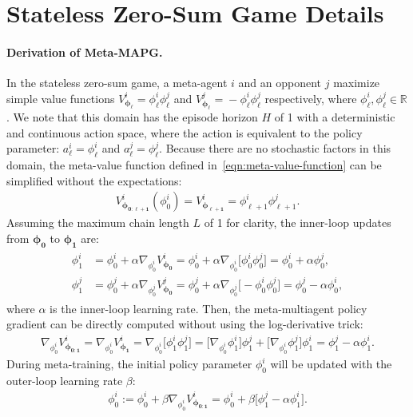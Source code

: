 \section{Stateless Zero-Sum Game Details}\label{sec:details-stateless-zero-sum}
\noindent\paragraph{Derivation of Meta-MAPG.}
In the stateless zero-sum game, a meta-agent $i$ and an opponent $j$ maximize simple value functions $V^{i}_{\bm{\phi}_{\bm{\ell}}}\!=\!\phi^{i}_{\ell}\phi^{j}_{\ell}$ and $V^{j}_{\bm{\phi}_{\bm{\ell}}}\!=\!-\phi^{i}_{\ell}\phi^{j}_{\ell}$ respectively, where $\phi^{i}_{\ell},\phi^{j}_{\ell}\!\in\!\mathbb{R}$. 
We note that this domain has the episode horizon $H$ of 1 with a deterministic and continuous action space, where the action is equivalent to the policy parameter: $a^{i}_{\ell}\!=\!\phi^{i}_{\ell}$ and $a^{j}_{\ell}\!=\!\phi^{j}_{\ell}$. Because there are no stochastic factors in this domain, the meta-value function defined in~\cref{eqn:meta-value-function} can be simplified without the expectations:
\begin{gather}
V^{i}_{\bm{\phi}_{\bm{0:\ell+1}}}(\phi^{i}_{0})=V^{i}_{\bm{\phi}_{\bm{\ell+1}}}=\phi^{i}_{\ell+1}\phi^{j}_{\ell+1}.
\end{gather}
Assuming the maximum chain length $L$ of 1 for clarity, the inner-loop updates from $\bm{\phi}_{\bm{0}}$ to $\bm{\phi}_{\bm{1}}$ are:
\begin{align}
\begin{split}
\phi^{i}_{1}&=\phi^{i}_{0}+\alpha\nabla_{\phi^{i}_{0}}V^{i}_{\bm{\phi}_{\bm{0}}}=\phi^{i}_{0}+\alpha\nabla_{\phi^{i}_{0}}\big[\phi^{i}_{0}\phi^{j}_{0}\big]=\phi^{i}_{0}+\alpha\phi^{j}_{0},\\
\phi^{j}_{1}&=\phi^{j}_{0}+\alpha\nabla_{\phi^{j}_{0}}V^{j}_{\bm{\phi}_{\bm{0}}}=\phi^{j}_{0}+\alpha\nabla_{\phi^{j}_{0}}\big[-\phi^{i}_{0}\phi^{j}_{0}\big]=\phi^{j}_{0}-\alpha\phi^{i}_{0},
\end{split}
\end{align}
where $\alpha$ is the inner-loop learning rate.
Then, the meta-multiagent policy gradient can be directly computed without using the log-derivative trick:
\begin{gather}
\nabla_{\phi^{i}_{0}}V^{i}_{\bm{\phi}_{\bm{0:1}}}=\nabla_{\phi^{i}_{0}}V^{i}_{\bm{\phi}_{\bm{1}}}=\nabla_{\phi^{i}_{0}}\big[\phi^{i}_{1}\phi^{j}_{1}\big]=\big[\nabla_{\phi^{i}_{0}}\phi^{i}_{1}\big]\phi^{j}_{1}+\big[\nabla_{\phi^{i}_{0}}\phi^{j}_{1}\big]\phi^{i}_{1}=\phi^{j}_{1}-\alpha\phi^{i}_{1}.\label{eqn:stateless-product-rule}
\end{gather}
During meta-training, the initial policy parameter $\phi^{i}_{0}$ will be updated with the outer-loop learning rate $\beta$:
\begin{gather}
\phi^{i}_{0}:=\phi^{i}_{0}+\beta\nabla_{\phi^{i}_{0}}V^{i}_{\bm{\phi}_{\bm{0:1}}}=\phi^{i}_{0}+\beta\big[\phi^{j}_{1}-\alpha\phi^{i}_{1}\big].
\end{gather}

